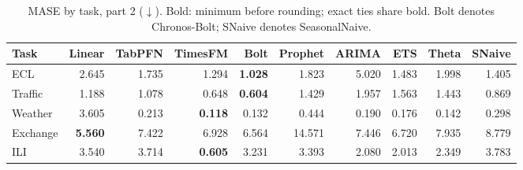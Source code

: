 \begin{table}[!htbp]
\centering
\caption{MASE by task, part 2 ($\downarrow$). Bold: minimum before rounding; exact ties share bold. Bolt denotes Chronos-Bolt; SNaive denotes SeasonalNaive.}
\label{tab:mase2}
\small
\setlength{\tabcolsep}{3.5pt}
\begin{tabular}{lrrrrrrrrr}
\hline
Task & Linear & TabPFN & TimesFM & Bolt & Prophet & ARIMA & ETS & Theta & SNaive \\
\hline
ECL & 2.645 & 1.735 & 1.294 & \textbf{1.028} & 1.823 & 5.020 & 1.483 & 1.998 & 1.405 \\
Traffic & 1.188 & 1.078 & 0.648 & \textbf{0.604} & 1.429 & 1.957 & 1.563 & 1.443 & 0.869 \\
Weather & 3.605 & 0.213 & \textbf{0.118} & 0.132 & 0.444 & 0.190 & 0.176 & 0.142 & 0.298 \\
Exchange & \textbf{5.560} & 7.422 & 6.928 & 6.564 & 14.571 & 7.446 & 6.720 & 7.935 & 8.779 \\
ILI & 3.540 & 3.714 & \textbf{0.605} & 3.231 & 3.393 & 2.080 & 2.013 & 2.349 & 3.783 \\
\hline
\end{tabular}
\end{table}
